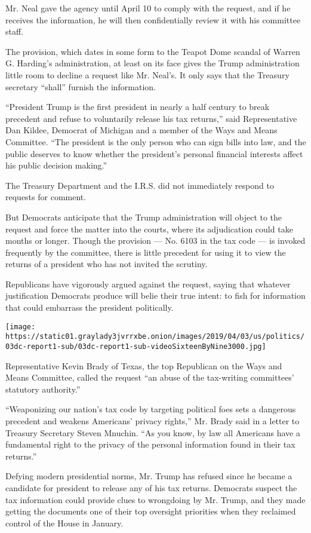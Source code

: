 Mr. Neal gave the agency until April 10 to comply with the request, and
if he receives the information, he will then confidentially review it
with his committee staff.

The provision, which dates in some form to the Teapot Dome scandal of
Warren G. Harding's administration, at least on its face gives the Trump
administration little room to decline a request like Mr. Neal's. It only
says that the Treasury secretary ``shall'' furnish the information.

``President Trump is the first president in nearly a half century to
break precedent and refuse to voluntarily release his tax returns,''
said Representative Dan Kildee, Democrat of Michigan and a member of the
Ways and Means Committee. ``The president is the only person who can
sign bills into law, and the public deserves to know whether the
president's personal financial interests affect his public decision
making.''

The Treasury Department and the I.R.S. did not immediately respond to
requests for comment.

But Democrats anticipate that the Trump administration will object to
the request and force the matter into the courts, where its adjudication
could take months or longer. Though the provision --- No. 6103 in the
tax code --- is invoked frequently by the committee, there is little
precedent for using it to view the returns of a president who has not
invited the scrutiny.

Republicans have vigorously argued against the request, saying that
whatever justification Democrats produce will belie their true intent:
to fish for information that could embarrass the president politically.

\texttt{[image: https://static01.graylady3jvrrxbe.onion/images/2019/04/03/us/politics/03dc-report1-sub/03dc-report1-sub-videoSixteenByNine3000.jpg]}

Representative Kevin Brady of Texas, the top Republican on the Ways and
Means Committee, called the request ``an abuse of the tax-writing
committees' statutory authority.''

``Weaponizing our nation's tax code by targeting political foes sets a
dangerous precedent and weakens Americans' privacy rights,'' Mr. Brady
said in a letter to Treasury Secretary Steven Mnuchin. ``As you know, by
law all Americans have a fundamental right to the privacy of the
personal information found in their tax returns.''

Defying modern presidential norms, Mr. Trump has refused since he became
a candidate for president to release any of his tax returns. Democrats
suspect the tax information could provide clues to wrongdoing by Mr.
Trump, and they made getting the documents one of their top oversight
priorities when they reclaimed control of the House in January.

